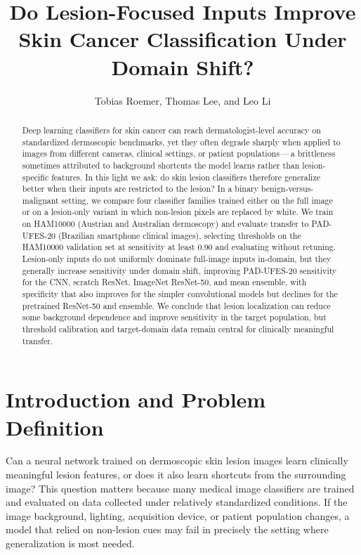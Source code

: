 \documentclass[10pt]{article}
\title{Do Lesion-Focused Inputs Improve Skin Cancer Classification Under Domain Shift?}
\author{Tobias Roemer, Thomas Lee, and Leo Li}
\date{}
\begin{document}
\maketitle

\begin{abstract}
Deep learning classifiers for skin cancer can reach dermatologist-level accuracy on standardized dermoscopic benchmarks, yet they often degrade sharply when applied to images from different cameras, clinical settings, or patient populations\,---\,a brittleness sometimes attributed to background shortcuts the model learns rather than lesion-specific features. In this light we ask: do skin lesion classifiers therefore generalize better when their inputs are restricted to the lesion? In a binary benign-versus-malignant setting, we compare four classifier families trained either on the full image or on a lesion-only variant in which non-lesion pixels are replaced by white. We train on HAM10000 (Austrian and Australian dermoscopy) and evaluate transfer to PAD-UFES-20 (Brazilian smartphone clinical images), selecting thresholds on the HAM10000 validation set at sensitivity at least 0.90 and evaluating without retuning. Lesion-only inputs do not uniformly dominate full-image inputs in-domain, but they generally increase sensitivity under domain shift, improving PAD-UFES-20 sensitivity for the CNN, scratch ResNet, ImageNet ResNet-50, and mean ensemble, with specificity that also improves for the simpler convolutional models but declines for the pretrained ResNet-50 and ensemble. We conclude that lesion localization can reduce some background dependence and improve sensitivity in the target population, but threshold calibration and target-domain data remain central for clinically meaningful transfer.
\end{abstract}

\section{Introduction and Problem Definition}

Can a neural network trained on dermoscopic skin lesion images learn clinically meaningful lesion features, or does it also learn shortcuts from the surrounding image? This question matters because many medical image classifiers are trained and evaluated on data collected under relatively standardized conditions. If the image background, lighting, acquisition device, or patient population changes, a model that relied on non-lesion cues may fail in precisely the setting where generalization is most needed.
\end{document}
